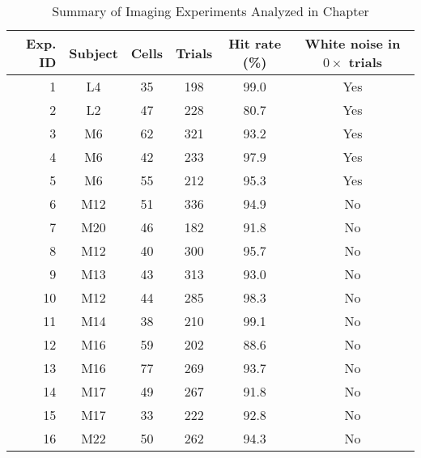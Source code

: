 
\begin{table}[htbp]
\centering

\caption{Summary of Imaging Experiments Analyzed in Chapter \thechapter}

\begin{tabular}{r|c|c|c|c|c}
Exp. ID & Subject &	\textnumero{} Cells & \textnumero{} Trials & Hit rate (\%) & White noise in $0\times$ trials\\
\hline
1  &	L4  & 35 & 198 &	99.0 &   Yes\\
2  &	L2  & 47 & 228 &	80.7 &   Yes\\
3  &	M6  & 62 & 321 &	93.2 &   Yes\\
4  &	M6  & 42 & 233 &	97.9 &   Yes\\
5  &	M6  & 55 & 212 &	95.3 &   Yes\\
6  &	M12 & 51 & 336 &	94.9 &   No\\	 
7  &	M20 & 46 & 182 &	91.8 &   No\\	 	 
8  &	M12 & 40 & 300 &	95.7 &   No\\	 	 
9  &	M13 & 43 & 313 &	93.0 &	 No\\	 
10 &	M12 & 44 & 285 &	98.3 &	 No\\	 
11 &	M14 & 38 & 210 &	99.1 &	 No\\	 
12 &	M16 & 59 & 202 &	88.6 &	 No\\	 
13 &	M16 & 77 & 269 &	93.7 &	 No\\	 
14 &	M17 & 49 & 267 &	91.8 &	 No\\	 
15 &	M17 & 33 & 222 &	92.8 &	 No\\	 
16 &	M22 & 50 & 262 &	94.3 &	 No\\	 
\end{tabular}

\label{tab:CC_table1}
\end{table}